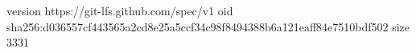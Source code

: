 version https://git-lfs.github.com/spec/v1
oid sha256:d036557cf443565a2cd8e25a5ccf34c98f8494388b6a121eaff84e7510bdf502
size 3331
